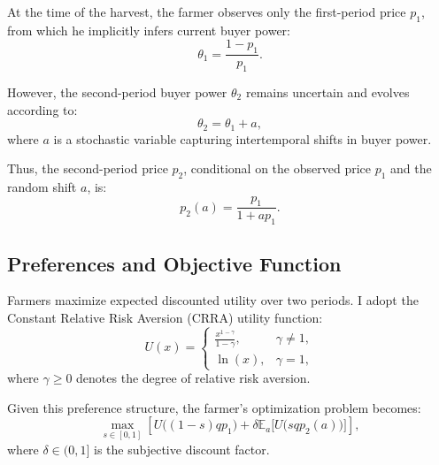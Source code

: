 \documentclass[12pt]{article}
\begin{document}
At the time of the harvest, the farmer observes only the first-period price \( p_1 \), from which he implicitly infers current buyer power:
\begin{equation}
    \theta_1 = \frac{1 - p_1}{p_1}.
\end{equation}

However, the second-period buyer power \( \theta_2 \) remains uncertain and evolves according to:
\begin{equation}
    \theta_2 = \theta_1 + a,
\end{equation}
where \( a \) is a stochastic variable capturing intertemporal shifts in buyer power.

Thus, the second-period price \( p_2 \), conditional on the observed price \( p_1 \) and the random shift \( a \), is:
\begin{equation}
    p_2(a) = \frac{p_1}{1 + a p_1}.
\end{equation}

\subsection{Preferences and Objective Function}

Farmers maximize expected discounted utility over two periods. I adopt the Constant Relative Risk Aversion (CRRA) utility function:
\begin{equation}
    U(x) = \begin{cases}
        \frac{x^{1 - \gamma}}{1 - \gamma}, & \gamma \neq 1, \\
        \ln(x), & \gamma = 1,
    \end{cases}
\end{equation}
where \( \gamma \geq 0 \) denotes the degree of relative risk aversion.

Given this preference structure, the farmer’s optimization problem becomes:
\begin{equation}
\label{eq:objective}
    \max_{s \in [0,1]} \left[U\big((1 - s) q p_1\big) + \delta \mathbb{E}_a\big[U\big(s q p_2(a)\big)\big]\right],
\end{equation}
where \(\delta \in (0,1]\) is the subjective discount factor.
\end{document}
